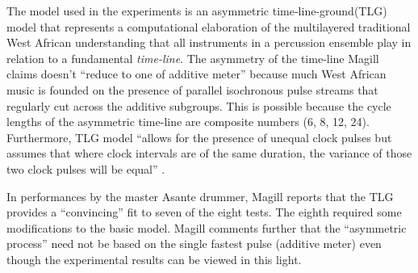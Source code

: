 The model used in the experiments is an asymmetric time-line-ground(TLG) model 
that represents a computational elaboration of the multilayered
traditional West African understanding that all instruments 
in a percussion ensemble play in relation to a fundamental {\it time-line}.
The asymmetry of the time-line Magill claims doesn't ``reduce to one of
additive meter'' \cite[p. 191]{Magill:97} because much West African
music is founded on the presence of parallel isochronous pulse streams
that regularly cut across the additive subgroups. This is possible
because the cycle lengths of the asymmetric time-line are composite 
numbers (6, 8, 12, 24).  Furthermore, TLG model ``allows for the
presence of unequal clock pulses but assumes that where clock
intervals are of the same duration, the variance of those two clock
pulses will be equal'' \cite[p. 191]{Magill:97}.

In performances by the master Asante drummer, Magill reports that 
the TLG provides a ``convincing'' fit to seven of the eight tests.
The eighth required some modifications to the basic model. 
Magill comments further that the ``asymmetric process'' need not be
based on the single fastest pulse (additive meter) even though the
experimental results can be viewed in this light.

 


